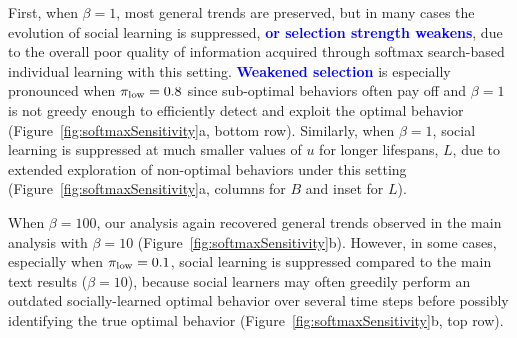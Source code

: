 \documentclass[letterpaper,11.5pt]{scrartcl}
\newcommand{\edit}[1]{{\bfseries \textcolor{blue} {#1}}}
\begin{document}
First, when $\beta=1$, most general trends are preserved, but in many cases the evolution
of social learning is suppressed, \edit{or selection strength weakens}, due to 
the overall poor quality of information acquired through softmax search-based
individual learning with this setting. \edit{Weakened selection} is especially pronounced 
when $\pi_{\mathrm{low}}=0.8$ since sub-optimal behaviors often pay off and $\beta=1$ is
not greedy enough to efficiently detect and exploit the optimal 
behavior (Figure~\ref{fig:softmaxSensitivity}a, bottom row).
Similarly, when $\beta = 1$, social learning is suppressed at much smaller values
of $u$ for longer lifespans, $L$, due to extended exploration of non-optimal
behaviors under this setting (Figure~\ref{fig:softmaxSensitivity}a, columns 
for $B$ and inset for $L$).

When $\beta=100$, our analysis again recovered general trends observed in the main analysis with
$\beta=10$ (Figure~\ref{fig:softmaxSensitivity}b). However, 
in some cases, especially when $\pi_{\mathrm{low}}=0.1$, social learning is suppressed compared to the main text results ($\beta=10$), because social learners may often greedily perform an outdated socially-learned optimal behavior over several time steps before possibly identifying the true optimal behavior (Figure~\ref{fig:softmaxSensitivity}b, top row).
\end{document}
